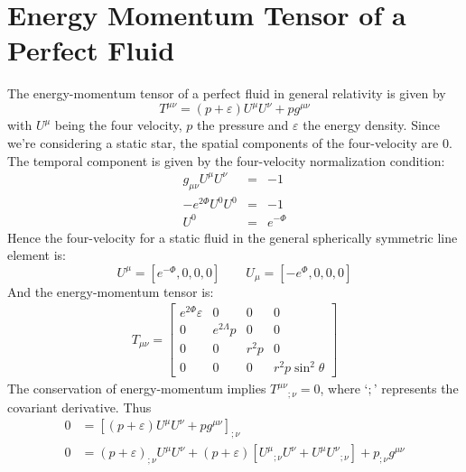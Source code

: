 \documentclass[a4paper,12pt,onehalfspacing]{report}
\begin{document}
\section{Energy Momentum Tensor of a Perfect Fluid}

The energy-momentum tensor of a perfect fluid in general relativity is given by
\begin{equation}
    T^{\mu\nu}= (p+\varepsilon)U^{\mu} U^{\nu}+ pg^{\mu\nu}\label{eq: perfect fluid}
\end{equation}
with $U^\mu$ being the four velocity, $p$ the pressure and $\varepsilon$ the energy density. Since we're considering a static star, the spatial components of the four-velocity are 0. The temporal component is given by the four-velocity normalization condition: 
\begin{eqnarray*}
    g_{\mu\nu} U^\mu U^\nu &=& -1 \\
    - e^{2\Phi}U^0 U^0 &=& -1\\ 
    U^0 &=&  e^{-\Phi}
\end{eqnarray*}
Hence the four-velocity for a static fluid in the general spherically symmetric line element is: 
\begin{equation}
    U^\mu= [ e^{-\Phi}, 0, 0, 0]\qquad U_\mu= [- e^{\Phi}, 0, 0, 0]\label{eq: four velocity}
\end{equation}
And the energy-momentum tensor is: 
\begin{align}
    T_{\mu\nu}= \begin{bmatrix}
         e^{2\Phi}\varepsilon & 0 & 0 & 0 \\
        0 &  e^{2\Lambda}p & 0 & 0 \\
        0 & 0 & r^2p & 0 \\
        0 & 0 & 0 & r^2p\sin^2\theta
    \end{bmatrix}\label{eq: perfect fluid elements}
\end{align}
The conservation of energy-momentum implies $T^{\mu\nu}{}_{;\nu}=0$, where `$;$' represents the covariant derivative. Thus
\begin{align*}
    0 &= \left[(p+\varepsilon)U^{\mu} U^{\nu}+ pg^{\mu\nu}\right]_{;\nu}\\
    0 &= (p+\varepsilon)_{;\nu}U^\mu U^\nu+ (p+\varepsilon)[U^\mu{}_{;\nu} U^\nu + U^\mu U^\nu{}_{;\nu}] + p_{;\nu}g^{\mu\nu}
\end{align*}
\end{document}
